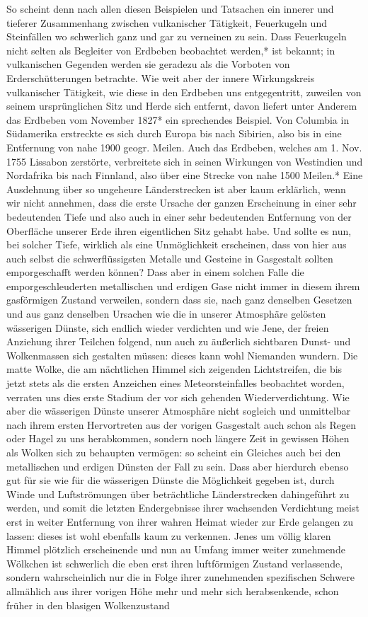 \documentclass[a4paper, 11pt, oneside, polutonikogreek, german]{article}
\begin{document}
So scheint denn nach allen diesen Beispielen und Tatsachen ein innerer und tieferer Zusammenhang zwischen vulkanischer Tätigkeit, Feuerkugeln und Steinfällen wo schwerlich ganz und gar zu verneinen zu sein. Dass Feuerkugeln nicht selten als Begleiter von Erdbeben beobachtet werden,* ist bekannt; in vulkanischen Gegenden werden sie geradezu als die Vorboten von Erderschütterungen betrachte. Wie weit aber der innere Wirkungskreis vulkanischer Tätigkeit, wie diese in den Erdbeben uns entgegentritt, zuweilen von seinem ursprünglichen Sitz und Herde sich entfernt, davon liefert unter Anderem das Erdbeben vom November 1827* ein sprechendes Beispiel. Von Columbia in Südamerika erstreckte es sich durch Europa bis nach Sibirien, also bis in eine Entfernung von nahe 1900 geogr. Meilen. Auch das Erdbeben, welches am 1. Nov. 1755 Lissabon zerstörte, verbreitete sich in seinen Wirkungen von Westindien und Nordafrika bis nach Finnland, also über eine Strecke von nahe 1500 Meilen.* Eine Ausdehnung über so ungeheure Länderstrecken ist aber kaum erklärlich, wenn wir nicht annehmen, dass die erste Ursache der ganzen Erscheinung in einer sehr bedeutenden Tiefe und also auch in einer sehr bedeutenden Entfernung von der Oberfläche unserer Erde ihren eigentlichen Sitz gehabt habe. Und sollte es nun, bei solcher Tiefe, wirklich als eine Unmöglichkeit erscheinen, dass von hier aus auch selbst die schwerflüssigsten Metalle und Gesteine in Gasgestalt sollten emporgeschafft werden können? Dass aber in einem solchen Falle die emporgeschleuderten metallischen und erdigen Gase nicht immer in diesem ihrem gasförmigen Zustand verweilen, sondern dass sie, nach ganz denselben Gesetzen und aus ganz denselben Ursachen wie die in unserer Atmosphäre gelösten wässerigen Dünste, sich endlich wieder verdichten und wie Jene, der freien Anziehung ihrer Teilchen folgend, nun auch zu äußerlich sichtbaren Dunst- und Wolkenmassen sich gestalten müssen: dieses kann wohl Niemanden wundern. Die matte Wolke, die am nächtlichen Himmel sich zeigenden Lichtstreifen, die bis jetzt stets als die ersten Anzeichen eines Meteorsteinfalles beobachtet worden, verraten uns dies erste Stadium der vor sich gehenden Wiederverdichtung. Wie aber die wässerigen Dünste unserer Atmosphäre nicht sogleich und unmittelbar nach ihrem ersten Hervortreten aus der vorigen Gasgestalt auch schon als Regen oder Hagel zu uns herabkommen, sondern noch längere Zeit in gewissen Höhen als Wolken sich zu behaupten vermögen: so scheint ein Gleiches auch bei den metallischen und erdigen Dünsten der Fall zu sein. Dass aber hierdurch ebenso gut für sie wie für die wässerigen Dünste die Möglichkeit gegeben ist, durch Winde und Luftströmungen über beträchtliche Länderstrecken dahingeführt zu werden, und somit die letzten Endergebnisse ihrer wachsenden Verdichtung meist erst in weiter Entfernung von ihrer wahren Heimat wieder zur Erde gelangen zu lassen: dieses ist wohl ebenfalls kaum zu verkennen. Jenes um völlig klaren Himmel plötzlich erscheinende und nun au Umfang immer weiter zunehmende Wölkchen ist schwerlich die eben erst ihren luftförmigen Zustand verlassende, sondern wahrscheinlich nur die in Folge ihrer zunehmenden spezifischen Schwere allmählich aus ihrer vorigen Höhe mehr und mehr sich herabsenkende, schon früher in den blasigen Wolkenzustand 
\end{document}
